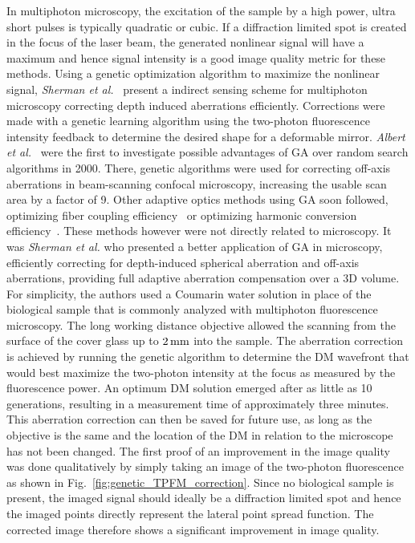 In multiphoton microscopy, the excitation of the sample by a high power, ultra short pulses is typically quadratic or cubic. If a diffraction limited spot is created in the focus of the laser beam, the generated nonlinear signal will have a maximum and hence signal intensity is a good image quality metric for these methods. Using a genetic optimization algorithm to maximize the nonlinear signal, \emph{Sherman et al.}~\cite{Genetic_MPFM} present a indirect sensing scheme for multiphoton microscopy correcting depth induced aberrations efficiently. Corrections were made with a genetic learning algorithm using the two-photon fluorescence intensity feedback to determine the desired shape for a deformable mirror. \emph{Albert et al.}~\cite{Genetic_smart_algorithm} were the first to investigate possible advantages of GA over random search algorithms in 2000. There, genetic algorithms were used for correcting off-axis aberrations in beam-scanning confocal microscopy, increasing the usable scan area by a factor of 9. Other adaptive optics methods using GA soon followed, optimizing fiber coupling efficiency~\cite{Genetic_fiber_coupling} or optimizing harmonic conversion efficiency~\cite{Genetic_Harmonic_optimization}. These methods however were not directly related to microscopy. It was \emph{Sherman et al.} who presented a better application of GA in microscopy, efficiently correcting for depth-induced spherical aberration and off-axis aberrations, providing full adaptive aberration compensation over a 3D volume. For simplicity, the authors used a Coumarin water solution in place of the biological sample that is commonly analyzed with multiphoton fluorescence microscopy. The long working distance objective allowed the scanning from the surface of the cover glass up to $\unit[2]{mm}$ into the sample. The aberration correction is achieved by running the genetic algorithm to determine the DM wavefront that would best maximize the two-photon intensity at the focus as measured by the fluorescence power. An optimum DM solution emerged after as little as 10 generations, resulting in a measurement time of approximately three minutes. This aberration correction can then be saved for future use, as long as the objective is the same and the location of the DM in relation to the microscope has not been changed. The first proof of an improvement in the image quality was done qualitatively by simply taking an image of the two-photon fluorescence as shown in Fig.~\ref{fig:genetic_TPFM_correction}. Since no biological sample is present, the imaged signal should ideally be a diffraction limited spot and hence the imaged points directly represent the lateral point spread function. The corrected image therefore shows a significant improvement in image quality.

